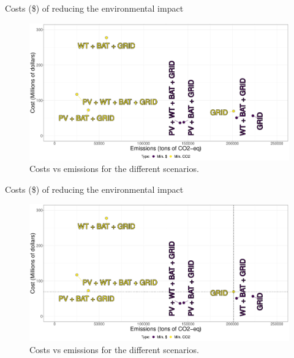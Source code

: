 \documentclass[Ligatures=TeX,table,svgnames,usetotalslideindicator,compress,10pt,aspectratio=169]{beamer}
\begin{document}
\begin{frame}{Costs (\$) of reducing the environmental impact}


\begin{figure}[h]
\centering
  \includegraphics[width=.9\textwidth]{images/costs_vs_co2_scenarios.pdf}
  \caption{Costs vs  emissions for the different scenarios.}
\end{figure}


\end{frame}

\addtocounter{framenumber}{-1}

\begin{frame}{Costs (\$) of reducing the environmental impact}


\begin{figure}[h]
\centering
  \includegraphics[width=.9\textwidth]{images/costs_vs_co2_scenarios_only_grid_co2.pdf}
  \caption{Costs vs  emissions for the different scenarios.}
\end{figure}


\end{frame}


\addtocounter{framenumber}{-1}
\end{document}
